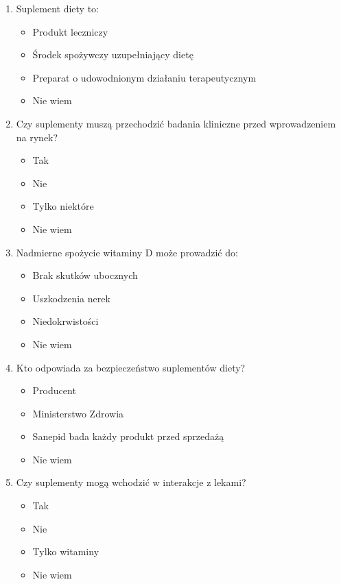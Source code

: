 \documentclass[a4paper, 12pt, oneside]{article}
\begin{document}
\begin{enumerate}
    \item Suplement diety to:
    \begin{itemize}
        \item Produkt leczniczy
        \item Środek spożywczy uzupełniający dietę
        \item Preparat o udowodnionym działaniu terapeutycznym
        \item Nie wiem
    \end{itemize}

    \item Czy suplementy muszą przechodzić badania kliniczne przed wprowadzeniem na rynek?
    \begin{itemize}
        \item Tak
        \item Nie
        \item Tylko niektóre
        \item Nie wiem
    \end{itemize}

    \item Nadmierne spożycie witaminy D może prowadzić do:
    \begin{itemize}
        \item Brak skutków ubocznych
        \item Uszkodzenia nerek
        \item Niedokrwistości
        \item Nie wiem
    \end{itemize}

    \item Kto odpowiada za bezpieczeństwo suplementów diety?
    \begin{itemize}
        \item Producent
        \item Ministerstwo Zdrowia
        \item Sanepid bada każdy produkt przed sprzedażą
        \item Nie wiem
    \end{itemize}

    \item Czy suplementy mogą wchodzić w interakcje z lekami?
    \begin{itemize}
        \item Tak
        \item Nie
        \item Tylko witaminy
        \item Nie wiem
    \end{itemize}


\end{enumerate}
\end{document}
